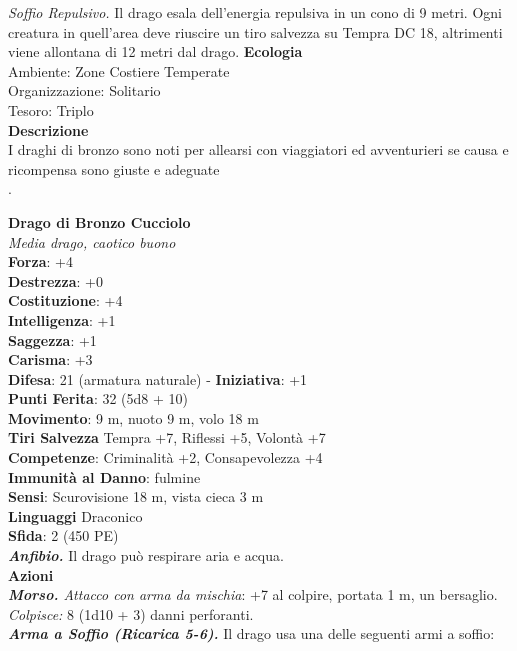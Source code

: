 \begin{multicols}{2}
\emph{Soffio Repulsivo.} Il drago esala dell'energia repulsiva in un cono di 9 metri. Ogni creatura in quell'area deve riuscire un tiro salvezza su Tempra DC  18, altrimenti viene allontana di 12 metri dal drago.
\textbf{Ecologia}\\
Ambiente: Zone Costiere Temperate\\
Organizzazione: Solitario\\
Tesoro: Triplo\\
\textbf{Descrizione}\\
I draghi di bronzo sono noti per allearsi con viaggiatori ed avventurieri se causa e ricompensa sono giuste e adeguate\\
.

\medskip\textbf{Drago di Bronzo Cucciolo}\\
\emph{Media drago, caotico buono}\\
\textbf{Forza}: +4\\
\textbf{Destrezza}: +0\\
\textbf{Costituzione}: +4\\
\textbf{Intelligenza}: +1\\
\textbf{Saggezza}: +1\\
\textbf{Carisma}: +3\\
\textbf{Difesa}: 21 (armatura naturale) - \textbf{Iniziativa}: +1\\
\textbf{Punti Ferita}: 32 (5d8 + 10)\\
\textbf{Movimento}: 9 m, nuoto 9 m, volo 18 m\\
\textbf{Tiri Salvezza} Tempra +7, Riflessi +5, Volontà +7\\
\textbf{Competenze}: Criminalità +2, Consapevolezza +4\\
\textbf{Immunità al Danno}: fulmine\\
\textbf{Sensi}: Scurovisione 18 m, vista cieca 3 m\\
\textbf{Linguaggi} Draconico\\
\textbf{Sfida}: 2 (450 PE)\smallskip\\
\emph{\textbf{Anfibio.}} Il drago può respirare aria e acqua.\\
\smallskip\textbf{Azioni}\\
\emph{\textbf{Morso.} Attacco con arma da mischia}: +7 al colpire, portata 1 m, un bersaglio.\\
\emph{Colpisce:} 8 (1d10 + 3) danni perforanti.\\
\emph{\textbf{Arma a Soffio (Ricarica 5-6).}} Il drago usa una delle seguenti armi a soffio:\\

\end{multicols}
